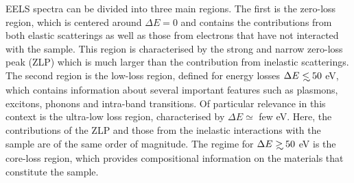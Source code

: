 EELS spectra can be divided into three main regions.
%
The first is the zero-loss region, which is centered around $\Delta E=0$
and contains the contributions from both elastic scatterings
as well as those from electrons that have not interacted with the
sample.
%
This region is characterised by the strong and narrow zero-loss peak (ZLP)
which is much larger than the contribution
from inelastic scatterings.
%
The second region is the low-loss region, defined for energy losses
$\Delta E \lsim 50$ eV, which contains information
about several important features such as plasmons, excitons, phonons and
intra-band transitions.
%
Of particular relevance in this context is the ultra-low loss region, characterised by $\Delta E \simeq$ few eV.
Here, the contributions of the ZLP and those from the inelastic interactions
with the sample are of the same order of magnitude.
%
The regime for $\Delta E \gsim 50$ eV is the core-loss region,
which provides compositional information
on the materials that constitute the sample.
 
